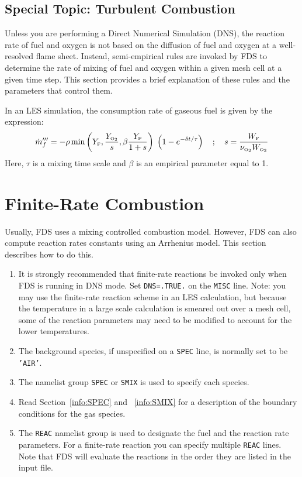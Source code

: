 \documentclass[11pt]{book}
\newcommand{\ct}{\tt\small}
\newcommand{\dt}{\delta t}
\newcommand{\dm}{\dot{m}}
\newcommand{\be}{\begin{equation}}
\newcommand{\ee}{\end{equation}}
\newcommand{\OTWO}{{\tiny \hbox{O}_2}}
\newcommand{\F}{{\tiny \hbox{F}}}
\begin{document}
\subsection{Special Topic: Turbulent Combustion}

\label{info:turbulent_combustion}

Unless you are performing a Direct Numerical Simulation (DNS), the reaction rate of fuel and oxygen is not based on the diffusion of
fuel and oxygen at a well-resolved flame sheet. Instead, semi-empirical rules are invoked by FDS to determine the rate of mixing of fuel and oxygen within
a given mesh cell at a given time step. This section provides a brief explanation of these rules and the parameters that control them.

In an LES simulation, the consumption rate of gaseous fuel is given by the expression:
\be \dm_f''' = -\rho \min \left( Y_\F , \frac{Y_\OTWO}{s}, \beta \frac{Y_{\hbox{\tiny P}}}{1+s} \right) \; \left( 1 - e^{-\dt/\tau} \right)   \quad ; \quad
   s=\frac{W_\F}{\nu_{\OTWO} W_{\OTWO} }  \ee
Here, $\tau$ is a mixing time scale and $\beta$ is an empirical parameter equal to 1.



\newpage


\section{Finite-Rate Combustion}
\label{info:finite}

Usually, FDS uses a mixing controlled combustion model. However, FDS can also compute reaction rates constants using an Arrhenius model. This section describes how to do this.

\begin{enumerate}
\item It is strongly recommended that finite-rate reactions be invoked only
when FDS is running in DNS mode. Set {\ct DNS=.TRUE.} on the {\ct MISC} line.
Note: you may use the finite-rate reaction scheme in an
LES calculation, but because the temperature in a large scale calculation
is smeared out over a mesh cell, some of the reaction parameters may need
to be modified to account for the lower temperatures.
\item The background species, if unspecified on a {\ct SPEC} line, is normally set to be {\ct 'AIR'}.
\item The namelist group {\ct SPEC} or {\ct SMIX} is used to specify each species.
\item Read Section~\ref{info:SPEC} and ~\ref{info:SMIX} for a description of the boundary
conditions for the gas species.
\item The {\ct REAC} namelist group is used to designate the fuel and the reaction rate
parameters.  For a finite-rate reaction you can specify multiple {\ct REAC} lines.  Note that
FDS will evaluate the reactions in the order they are listed in the input file. %
\end{enumerate}
\end{document}
